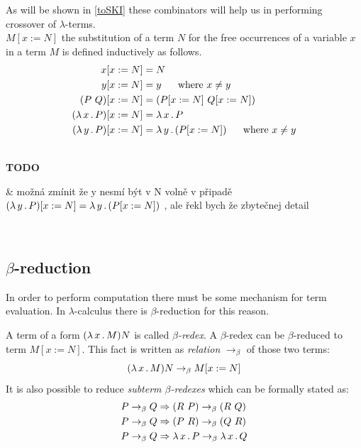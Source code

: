 \documentclass[12pt,a4paper]{report}
\newcommand{\lterms}{$\lambda$-terms\xspace}
\newenvironment{todo}
{ ~\\[0.5em]
  {\color{red}\textbf{TODO}}
  \begin{easylist}[itemize]}
{ \end{easylist}
  ~}
\begin{document}
As will be shown in \ref{toSKI}
these combinators will help us in performing crossover of \lterms.\\

$M[x:=N]$ the substitution of a term $N$ for the free occurrences of 
a variable $x$ in a term $M$ is defined inductively as follows.
\begin{align*}
x[x:=N]           &= N \\
y[x:=N]           &= y \text{ ~~~~where } x \not= y  \\
(P~Q)[x:=N]       &= ( P[x:=N]  ~ Q[x:=N] ) \\
( \lambda \, x \, . \, P )[x:=N] &= \lambda \, x \, . \, P\\
( \lambda \, y \, . \, P )[x:=N] &= \lambda \, y \, . \, ( P[x:=N] ) \text{ ~~~~where } x \not= y
\end{align*}




\begin{todo}
& možná zmínit že y nesmí být v N volně v připadě\\
  $( \lambda \, y \, . \, P )[x:=N] = \lambda \, y \, . \, ( P[x:=N] )$ , 
  ale řekl bych že zbytečnej detail
\end{todo}


\subsection{$\beta$-reduction}

In order to perform computation there must be some
mechanism for term evaluation. In $\lambda$-calculus there
is $\beta$-reduction for this reason.\\

\newcommand{\bRedex}{$\beta$-redex\xspace}
\newcommand{\bRedexes}{$\beta$-redexes\xspace}
\newcommand{\bArrow}{\rightarrow_\beta\xspace}
\newcommand{\eArrow}{\rightarrow_\eta\xspace}
\newcommand{\eeArrow}{\rightarrow_{\eta^{-1}}\xspace}

A term of a form $( \lambda \, x \, . \, M )N$ is called \textit{\bRedex}.
A \bRedex can be $\beta$-reduced to term $M[x:=N]$. 
This fact is written as \textit{relation} $\bArrow$ 
of those two terms:
\begin{equation} \label{eq:bRed}
\lamb{x}{M}N \bArrow M[x:=N]
\end{equation}
It is also possible to reduce \textit{subterm \bRedexes} 
which can be formally stated as:
\begin{align*}
P \bArrow Q &\then (R~P)      \bArrow (R~Q) \\
P \bArrow Q &\then (P~R)      \bArrow (Q~R) \\
P \bArrow Q &\then \lam{x}{P} \bArrow \lam{x}{Q}  
\end{align*}
\end{document}
